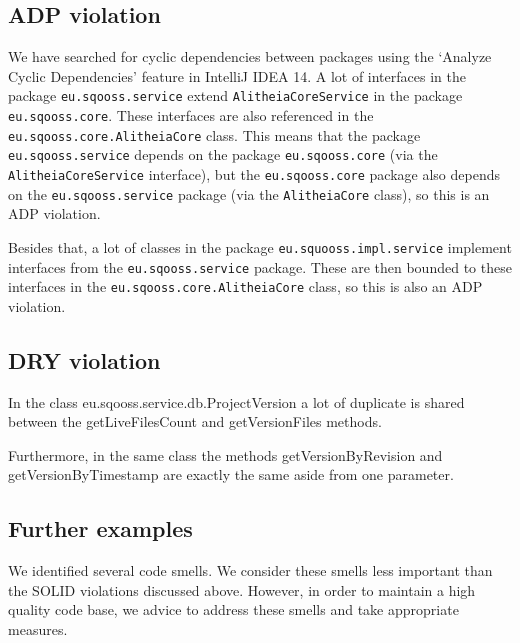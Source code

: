 \documentclass{article}
\begin{document}
\subsection{ADP violation}

We have searched for cyclic dependencies between packages using the `Analyze Cyclic Dependencies' feature in IntelliJ IDEA 14. A lot of interfaces in the package \verb|eu.sqooss.service| extend \verb|AlitheiaCoreService| in the package \verb|eu.sqooss.core|. These interfaces are also referenced in the \verb|eu.sqooss.core.AlitheiaCore| class. This means that the package \verb|eu.sqooss.service| depends on the package \verb|eu.sqooss.core| (via the \verb|AlitheiaCoreService| interface), but the \verb|eu.sqooss.core| package also depends on the \verb|eu.sqooss.service| package (via the \verb|AlitheiaCore| class), so this is an ADP violation.


Besides that, a lot of classes in the package \verb|eu.squooss.impl.service| implement interfaces from the \verb|eu.sqooss.service| package. These are then bounded to these interfaces in the \verb|eu.sqooss.core.AlitheiaCore| class, so this is also an ADP violation.

\subsection{DRY violation}
In the class eu.sqooss.service.db.ProjectVersion a lot of duplicate is shared between the getLiveFilesCount and getVersionFiles methods. 

Furthermore, in the same class the methods getVersionByRevision and getVersionByTimestamp are exactly the same aside from one parameter.


\subsection{Further examples}
We identified several code smells. We consider these smells less important than the SOLID violations discussed above. However, in order to maintain a high quality code base, we advice to address these smells and take appropriate measures.
\end{document}
